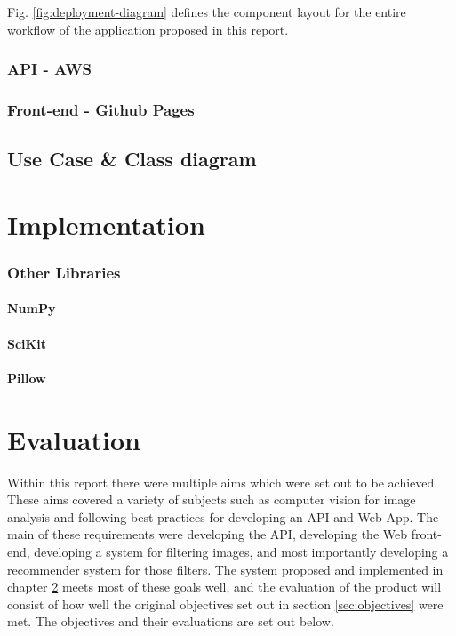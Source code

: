 \documentclass[a4paper,12pt]{report}
\begin{document}
      Fig. \ref{fig:deployment-diagram} defines the component layout for the entire workflow of the application proposed in this report.

      \subsection{API - AWS}

      \subsection{Front-end - Github Pages}

    \section{Use Case \& Class diagram}


\chapter{Implementation} \label{cha:implement}

      \subsection{Other Libraries}

        \subsubsection{NumPy} \label{sec:numpy}

        \subsubsection{SciKit} \label{sec:scikit}

        \subsubsection{Pillow} \label{sec:pillow}

\chapter{Evaluation}
  Within this report there were multiple aims which were set out to be achieved. These aims covered a variety of subjects such as computer vision for image analysis and following best practices for developing an API and Web App. The main of these requirements were developing the API, developing the Web front-end, developing a system for filtering images, and most importantly developing a recommender system for those filters. The system proposed and implemented in chapter \ref{cha:implement} meets most of these goals well, and the evaluation of the product will consist of how well the original objectives set out in section \ref{sec:objectives} were met. The objectives and their evaluations are set out below.
\end{document}
